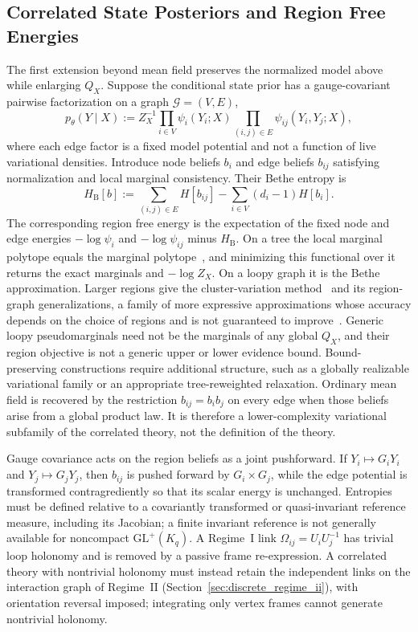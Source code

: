 \documentclass[11pt]{article}
\begin{document}
\subsection{Correlated State Posteriors and Region Free Energies}

The first extension beyond mean field preserves the normalized model above while enlarging $Q_X$. Suppose the conditional state prior has a gauge-covariant pairwise factorization on a graph $\mathcal{G}=(V,E)$,
\begin{equation}
p_\theta(Y\mid X)
:=Z_X^{-1}
\prod_{i\in V}\psi_i(Y_i;X)
\prod_{(i,j)\in E}\psi_{ij}(Y_i,Y_j;X),
\label{eq:beyond_mf_pairwise_joint}
\end{equation}
where each edge factor is a fixed model potential and not a function of live variational densities. Introduce node beliefs $b_i$ and edge beliefs $b_{ij}$ satisfying normalization and local marginal consistency. Their Bethe entropy is
\begin{equation}
H_{\mathrm{B}}[b]
:=\sum_{(i,j)\in E}H[b_{ij}]
-\sum_{i\in V}(d_i-1)H[b_i].
\label{eq:beyond_mf_bethe_entropy}
\end{equation}
The corresponding region free energy is the expectation of the fixed node and edge energies $-\log\psi_i$ and $-\log\psi_{ij}$ minus $H_{\mathrm{B}}$. On a tree the local marginal polytope equals the marginal polytope~\cite[Prop.~4.1]{Wainwright2008}, and minimizing this functional over it returns the exact marginals and $-\log Z_X$. On a loopy graph it is the Bethe approximation. Larger regions give the cluster-variation method~\cite{Kikuchi1951} and its region-graph generalizations, a family of more expressive approximations whose accuracy depends on the choice of regions and is not guaranteed to improve~\cite[Sec.~VIII.C]{Yedidia2005}. Generic loopy pseudomarginals need not be the marginals of any global $Q_X$, and their region objective is not a generic upper or lower evidence bound. Bound-preserving constructions require additional structure, such as a globally realizable variational family or an appropriate tree-reweighted relaxation. Ordinary mean field is recovered by the restriction $b_{ij}=b_i b_j$ on every edge when those beliefs arise from a global product law. It is therefore a lower-complexity variational subfamily of the correlated theory, not the definition of the theory.

Gauge covariance acts on the region beliefs as a joint pushforward. If $Y_i\mapsto G_iY_i$ and $Y_j\mapsto G_jY_j$, then $b_{ij}$ is pushed forward by $G_i\times G_j$, while the edge potential is transformed contragrediently so that its scalar energy is unchanged. Entropies must be defined relative to a covariantly transformed or quasi-invariant reference measure, including its Jacobian; a finite invariant reference is not generally available for noncompact $\mathrm{GL}^+(K_q)$. A Regime~I link $\Omega_{ij}=U_iU_j^{-1}$ has trivial loop holonomy and is removed by a passive frame re-expression. A correlated theory with nontrivial holonomy must instead retain the independent links on the interaction graph of Regime~II (Section~\ref{sec:discrete_regime_ii}), with orientation reversal imposed; integrating only vertex frames cannot generate nontrivial holonomy.
\end{document}
